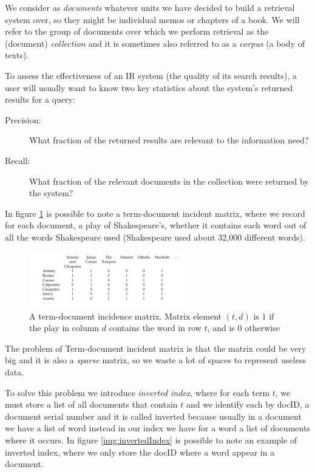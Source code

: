 We consider as \emph{documents} whatever units we have
decided to build a retrieval system over, so they might be individual memos or chapters of a book.\newline
We will refer to the group of documents over which we perform retrieval as the
(document) \emph{collection} and it is sometimes also referred to as a \emph{corpus} (a body of texts).

To assess the effectiveness of an IR system (the quality of its search results), a user will usually want
to know two key statistics about the system’s returned results for a query:
\begin{description}
    \item [Precision: ] What fraction of the returned results are relevant to the information need?
    \item [Recall: ]    What fraction of the relevant documents in the collection were returned by the system?
\end{description}

In figure \ref{img:booleanMatrix} is possible to note a term-document incident matrix, where we 
record for each document, a play of Shakespeare’s, whether it contains each word 
out of all the words Shakespeare used (Shakespeare used about 32,000 different words).

\begin{figure}
    \includegraphics[width=0.6\textwidth]{Images/booleanMatrix}
    \caption{A term-document incidence matrix. Matrix element $(t, d)$ is $1$ if the play in column $d$
             contains the word in row $t$, and is $0$ otherwise}
    \label{img:booleanMatrix}
\end{figure}
The problem of Term-document incident matrix is that the matrix could be very big and it is also a \emph{sparse}
matrix, so we waste a lot of spaces to represent useless data.

To solve this problem we introduce \emph{inverted index}, where for each term $t$, we must store a list 
of all documents that contain $t$ and we identify each by docID, a document serial number and 
it is called inverted because usually in a document we have a list of word instead in our index we have 
for a word a list of documents where it occurs.\newline
In figure \ref{img:invertedIndex} is possible to note an example of inverted index, where we only store the docID
where a word appear in a document.


